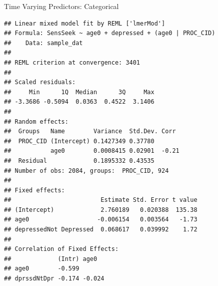 \begin{frame}[fragile]{Time Varying Predictors: Categorical}

\small

\begin{Shaded}
\end{Shaded}

\end{frame}

\begin{frame}[fragile]

\tiny

\begin{verbatim}
## Linear mixed model fit by REML ['lmerMod']
## Formula: SensSeek ~ age0 + depressed + (age0 | PROC_CID)
##    Data: sample_dat
## 
## REML criterion at convergence: 3401
## 
## Scaled residuals: 
##     Min      1Q  Median      3Q     Max 
## -3.3686 -0.5094  0.0363  0.4522  3.1406 
## 
## Random effects:
##  Groups   Name        Variance  Std.Dev. Corr 
##  PROC_CID (Intercept) 0.1427349 0.37780       
##           age0        0.0008415 0.02901  -0.21
##  Residual             0.1895332 0.43535       
## Number of obs: 2084, groups:  PROC_CID, 924
## 
## Fixed effects:
##                         Estimate Std. Error t value
## (Intercept)             2.760189   0.020388  135.38
## age0                   -0.006154   0.003564   -1.73
## depressedNot Depressed  0.068617   0.039992    1.72
## 
## Correlation of Fixed Effects:
##             (Intr) age0  
## age0        -0.599       
## dprssdNtDpr -0.174 -0.024
\end{verbatim}

\normalsize

\end{frame}

